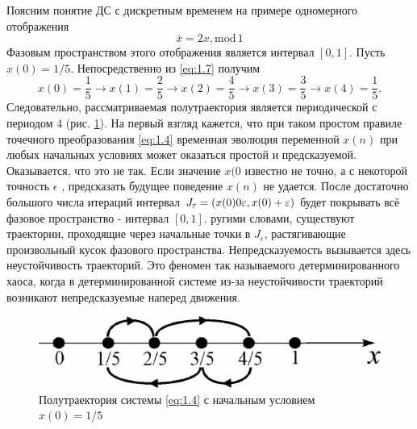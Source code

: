 Поясним понятие ДС с дискретным временем на примере одномерного отображения
\begin{equation}
	\label{eq:1.7}
	\bar x = 2x, \textrm{mod}\,1
\end{equation}
Фазовым пространством этого отображения является интервал $[0, 1]$. Пусть 
$x(0)= 1/5$. Непосредственно из \eqref{eq:1.7} получим
\begin{equation}
	x(0) = \frac15 \rightarrow x(1)= \frac25 \rightarrow x(2) = \frac45 \rightarrow x(3) = \frac35 \rightarrow x(4) = \frac15.	
\end{equation}
Следовательно, рассматриваемая полутраектория является периодической с периодом 4 (рис. \ref{fig:1.1}). На первый взгляд кажется, что при таком простом правиле точечного преобразования \eqref{eq:1.4} временная эволюция переменной $x(n)$ при любых начальных условиях может оказаться простой и предсказуемой. Оказывается, что это не так. Если значение $x(0$ известно не точно, а с некоторой точность $\epsilon$ , предсказать будущее поведение $x(n)$ не удается. После достаточно большого числа итераций интервал $J_{\varepsilon} = \qty(x(0) 0 \varepsilon, x(0) + \varepsilon)$ будет покрывать всё фазовое пространство - интервал $[0, 1]$. ругими словами, существуют траектории, проходящие через начальные точки в $J_\epsilon$, растягивающие произвольный кусок фазового пространства. Непредсказуемость вызывается здесь неустойчивость траекторий. Это феномен так называемого детерминированного хаоса, когда в детерминированной системе из-за неустойчивости траекторий возникают непредсказуемые наперед движения.
 \begin{figure}[h!]
 	\centering
    \includegraphics[]{fig/lect1/1}
 	\caption{Полутраектория системы \eqref{eq:1.4} с начальным условием $x(0)=1/5$}
 	\label{fig:1.1}
\end{figure}


